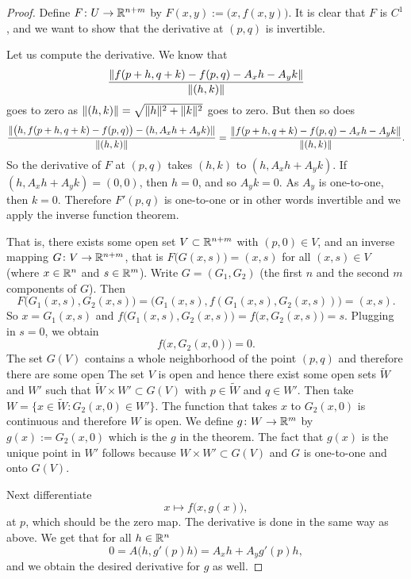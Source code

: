 \begin{proof}
Define $F \colon U \to {\mathbb{R}}^{n+m}$ by $F(x,y) := \bigl(x,f(x,y)\bigr)$.
It is clear that $F$ is $C^1$, and we want to show that the derivative
at $(p,q)$ is invertible.

Let us compute the derivative.  We know that
\begin{equation*}
\frac{\lVert {f(p+h,q+k) - f(p,q) - A_x h - A_y k} \rVert}{\lVert {(h,k)} \rVert}
\end{equation*}
goes to zero as $\lVert {(h,k)} \rVert = \sqrt{\lVert {h} \rVert^2+\lVert {k} \rVert^2}$ goes to zero.
But then so does
\begin{equation*}
\frac{\lVert {\bigl(h,f(p+h,q+k)-f(p,q)\bigr) - (h,A_x h+A_y
k)} \rVert}{\lVert {(h,k)} \rVert}
=
\frac{\lVert {f(p+h,q+k) - f(p,q) - A_x h - A_y k} \rVert}{\lVert {(h,k)} \rVert} .
\end{equation*}
So the derivative of $F$ at $(p,q)$ takes $(h,k)$ to $(h,A_x h+A_y k)$.  If 
$(h,A_x h+A_y k) = (0,0)$, then $h=0$, and so $A_y k = 0$.  As $A_y$ is
one-to-one, then $k=0$.  Therefore $F'(p,q)$ is one-to-one or in other
words invertible and we apply the inverse function theorem.

That is, there exists some open set $V \subset {\mathbb{R}}^{n+m}$ with $(p,0) \in V$, and an inverse
mapping $G \colon V \to {\mathbb{R}}^{n+m}$, that is $F\bigl(G(x,s)\bigr) = (x,s)$ for
all $(x,s) \in V$ (where
$x \in {\mathbb{R}}^n$ and $s \in {\mathbb{R}}^m$).
Write $G = (G_1,G_2)$ (the first $n$ and the second $m$ components of $G$).
Then
\begin{equation*}
F\bigl(G_1(x,s),G_2(x,s)\bigr) = \bigl(G_1(x,s),f(G_1(x,s),G_2(x,s))\bigr)
= (x,s) .
\end{equation*}
So $x = G_1(x,s)$ and $f\bigl(G_1(x,s),G_2(x,s)\bigr) = f\bigl(x,G_2(x,s)\bigr) = s$.
Plugging in $s=0$, we obtain
\begin{equation*}
f\bigl(x,G_2(x,0)\bigr) = 0 .
\end{equation*}
The set $G(V)$ contains a whole neighborhood of the point $(p,q)$
and therefore there are some open
The set $V$ is open and hence there exist some open sets
$\widetilde{W}$ and $W'$ such that $\widetilde{W} \times W' \subset G(V)$ with $p
\in \widetilde{W}$ and
$q \in W'$.
Then take $W = \{ x \in \widetilde{W} : G_2(x,0) \in W' \}$.
The function that takes $x$ to $G_2(x,0)$ is continuous and therefore $W$
is open.
We define
$g \colon W \to {\mathbb{R}}^m$ by $g(x) := G_2(x,0)$ which is the $g$ in the theorem.
The fact that $g(x)$ is the unique point in $W'$ follows because $W \times
W' \subset G(V)$ and $G$ is one-to-one and onto $G(V)$.

Next differentiate
\begin{equation*}
x\mapsto f\bigl(x,g(x)\bigr) ,
\end{equation*}
at $p$,
which should be the zero map.  The derivative is done in the same way as
above.  We get that for all $h \in {\mathbb{R}}^{n}$
\begin{equation*}
0 = A\bigl(h,g'(p)h\bigr) = A_xh + A_yg'(p)h ,
\end{equation*}
and we obtain the desired derivative for $g$ as well.
\end{proof}

